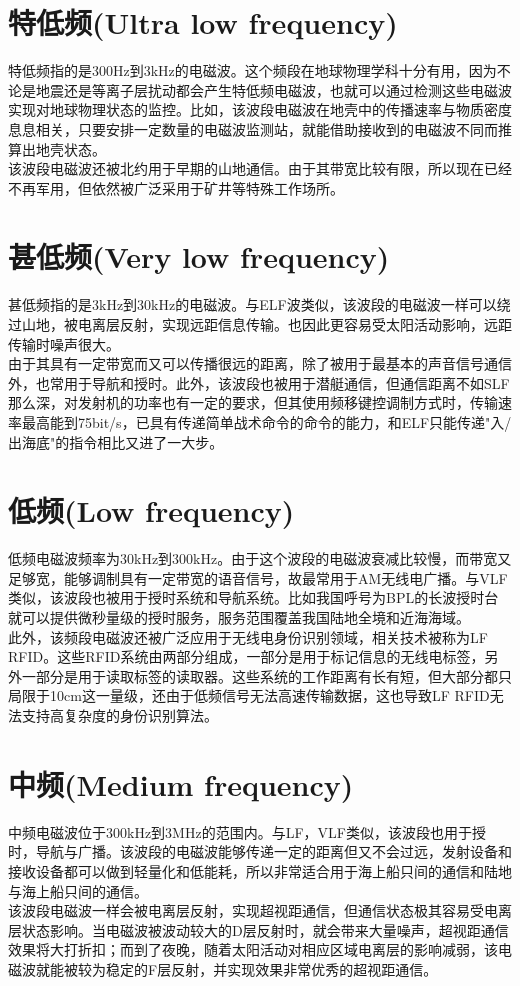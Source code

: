 \documentclass[UTF8]{article}
\begin{document}
\begin{CJK}{UTF8}{gkai}
\section{特低频(Ultra low frequency)}
特低频指的是300Hz到3kHz的电磁波。这个频段在地球物理学科十分有用，因为不论是地震\cite{Thomas2009On}还是等离子层扰动都会产生特低频电磁波，也就可以通过检测这些电磁波实现对地球物理状态的监控。比如，该波段电磁波在地壳中的传播速率与物质密度息息相关，只要安排一定数量的电磁波监测站，就能借助接收到的电磁波不同而推算出地壳状态。\\
该波段电磁波还被北约用于早期的山地通信\cite{Jan2001AGARD}。由于其带宽比较有限，所以现在已经不再军用，但依然被广泛采用于矿井等特殊工作场所。
\section{甚低频(Very low frequency)}
甚低频指的是3kHz到30kHz的电磁波。与ELF波类似，该波段的电磁波一样可以绕过山地，被电离层反射，实现远距信息传输。也因此更容易受太阳活动影响，远距传输时噪声很大\cite{Ghosh2002Electromagnetic}。\\
由于其具有一定带宽而又可以传播很远的距离，除了被用于最基本的声音信号通信外，也常用于导航和授时。此外，该波段也被用于潜艇通信，但通信距离不如SLF那么深，对发射机的功率也有一定的要求，但其使用频移键控调制方式时，传输速率最高能到75bit/s，已具有传递简单战术命令的命令的能力，和ELF只能传递"入/出海底"的指令相比又进了一大步。
\section{低频(Low frequency)}
低频电磁波频率为30kHz到300kHz。由于这个波段的电磁波衰减比较慢，而带宽又足够宽，能够调制具有一定带宽的语音信号，故最常用于AM无线电广播。与VLF类似，该波段也被用于授时系统和导航系统。比如我国呼号为BPL的长波授时台就可以提供微秒量级的授时服务，服务范围覆盖我国陆地全境和近海海域。\\
此外，该频段电磁波还被广泛应用于无线电身份识别领域，相关技术被称为LF RFID。这些RFID系统由两部分组成，一部分是用于标记信息的无线电标签，另外一部分是用于读取标签的读取器。这些系统的工作距离有长有短，但大部分都只局限于10cm这一量级，还由于低频信号无法高速传输数据，这也导致LF RFID无法支持高复杂度的身份识别算法\cite{Weis2011RFID}。
\section{中频(Medium frequency)}
中频电磁波位于300kHz到3MHz的范围内。与LF，VLF类似，该波段也用于授时，导航与广播。该波段的电磁波能够传递一定的距离但又不会过远，发射设备和接收设备都可以做到轻量化和低能耗，所以非常适合用于海上船只间的通信和陆地与海上船只间的通信。\\
该波段电磁波一样会被电离层反射，实现超视距通信，但通信状态极其容易受电离层状态影响。当电磁波被波动较大的D层反射时，就会带来大量噪声，超视距通信效果将大打折扣；而到了夜晚，随着太阳活动对相应区域电离层的影响减弱，该电磁波就能被较为稳定的F层反射，并实现效果非常优秀的超视距通信\cite{Ghosh2002Electromagnetic}。

\end{CJK}
\end{document}
